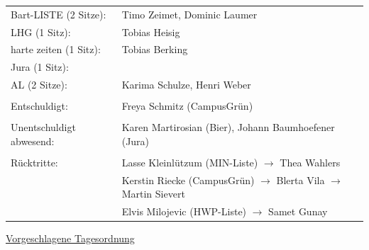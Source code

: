 \documentclass[ngerman,headheight=70pt]{scrartcl}
\begin{document}
\begin{tabular}{ll}
             Bart-LISTE (2 Sitze): & Timo Zeimet, Dominic Laumer \\
             LHG (1 Sitz): & Tobias Heisig \\
             harte zeiten (1 Sitz): & Tobias Berking \\
             Jura (1 Sitz): & \\
             AL (2 Sitze): & Karima Schulze, Henri Weber \\
            & \\
        Entschuldigt: & Freya Schmitz (CampusGrün)\\
                                &\\
        Unentschuldigt abwesend: & Karen Martirosian (Bier), Johann Baumhoefener (Jura) \\
                                &\\
        Rücktritte: & Lasse Kleinlützum (MIN-Liste) \(\rightarrow\) Thea Wahlers \\
                    & Kerstin Riecke (CampusGrün) \(\rightarrow\) Blerta Vila \(\rightarrow\) Martin Sievert\\
                    & Elvis Milojevic (HWP-Liste) \(\rightarrow\) Samet Gunay
    \end{tabular}
    \newpage
    \underline{Vorgeschlagene Tagesordnung}
\end{document}
